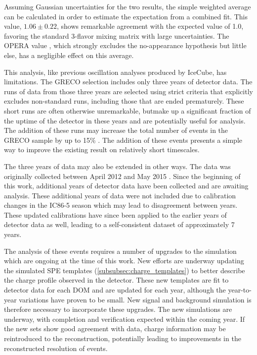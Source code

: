 Assuming Gaussian uncertainties for the two results, the simple weighted average can be calculated in order to estimate the expectation from a combined fit.
This value, $\mathtt{1.06\pm0.22}$, shows remarkable agreement with the expected value of 1.0, favoring the standard 3-flavor mixing matrix with large uncertainties.
The OPERA value , which strongly excludes the no-appearance hypothesis but little else, has a negligible effect on this average.

This analysis, like previous oscillation analyses produced by IceCube, has limitations.
The GRECO selection includes only three years of detector data.
The runs of data from those three years are selected using strict criteria that explicitly excludes non-standard runs, including those that are ended prematurely.
These short runs are often otherwise unremarkable, butmake up a significant fraction of the uptime of the detector in these years and are potentially useful for analysis.
The addition of these runs may increase the total number of events in the GRECO sample by up to 15\% .
The addition of these events presents a simple way to improve the existing result on relatively short timescales.

The three years of data may also be extended in other ways.
The data was originally collected between April 2012 and May 2015 .
Since the beginning of this work, additional years of detector data have been collected and are awaiting analysis.
These additional years of data were not included due to calibration changes in the IC86-5 season which may lead to disagreement between years.
These updated calibrations have since been applied to the earlier years of detector data as well, leading to a self-consistent dataset of approximately 7 years.

The analysis of these events requires a number of upgrades to the simulation which are ongoing at the time of this work.
New efforts are underway updating the simulated SPE templates (\ref{subsubsec:charge_templates}) to better describe the charge profile observed in the detector.
These new templates are fit to detector data for each DOM and are updated for each year, although the year-to-year variations have proven to be small.
New signal and background simulation is therefore necessary to incorporate these upgrades.
The new simulations are underway, with completion and verification expected within the coming year.
If the new sets show good agreement with data, charge information may be reintroduced to the reconstruction, potentially leading to improvements in the reconstructed resolution of events.

